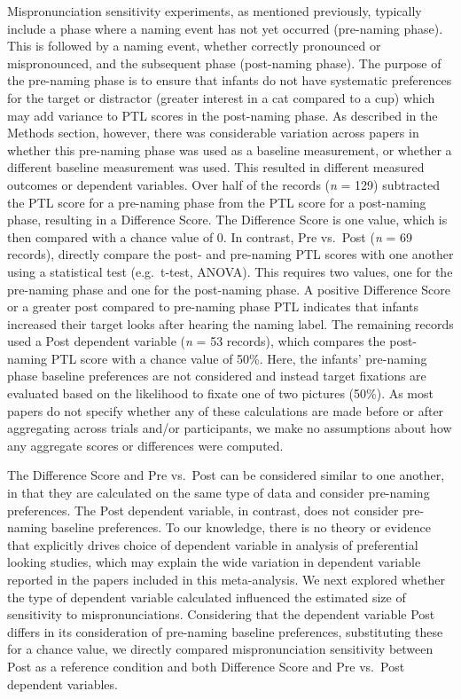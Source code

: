 \documentclass[man]{apa6}
\begin{document}
Mispronunciation sensitivity experiments, as mentioned previously, typically include a phase where a naming event has not yet occurred (pre-naming phase). This is followed by a naming event, whether correctly pronounced or mispronounced, and the subsequent phase (post-naming phase). The purpose of the pre-naming phase is to ensure that infants do not have systematic preferences for the target or distractor (greater interest in a cat compared to a cup) which may add variance to PTL scores in the post-naming phase. As described in the Methods section, however, there was considerable variation across papers in whether this pre-naming phase was used as a baseline measurement, or whether a different baseline measurement was used. This resulted in different measured outcomes or dependent variables. Over half of the records (\emph{n} = 129) subtracted the PTL score for a pre-naming phase from the PTL score for a post-naming phase, resulting in a Difference Score. The Difference Score is one value, which is then compared with a chance value of 0. In contrast, Pre vs.~Post (\emph{n} = 69 records), directly compare the post- and pre-naming PTL scores with one another using a statistical test (e.g.~t-test, ANOVA). This requires two values, one for the pre-naming phase and one for the post-naming phase. A positive Difference Score or a greater post compared to pre-naming phase PTL indicates that infants increased their target looks after hearing the naming label. The remaining records used a Post dependent variable (\emph{n} = 53 records), which compares the post-naming PTL score with a chance value of 50\%. Here, the infants' pre-naming phase baseline preferences are not considered and instead target fixations are evaluated based on the likelihood to fixate one of two pictures (50\%). As most papers do not specify whether any of these calculations are made before or after aggregating across trials and/or participants, we make no assumptions about how any aggregate scores or differences were computed.

The Difference Score and Pre vs.~Post can be considered similar to one another, in that they are calculated on the same type of data and consider pre-naming preferences. The Post dependent variable, in contrast, does not consider pre-naming baseline preferences. To our knowledge, there is no theory or evidence that explicitly drives choice of dependent variable in analysis of preferential looking studies, which may explain the wide variation in dependent variable reported in the papers included in this meta-analysis. We next explored whether the type of dependent variable calculated influenced the estimated size of sensitivity to mispronunciations. Considering that the dependent variable Post differs in its consideration of pre-naming baseline preferences, substituting these for a chance value, we directly compared mispronunciation sensitivity between Post as a reference condition and both Difference Score and Pre vs.~Post dependent variables.
\end{document}
